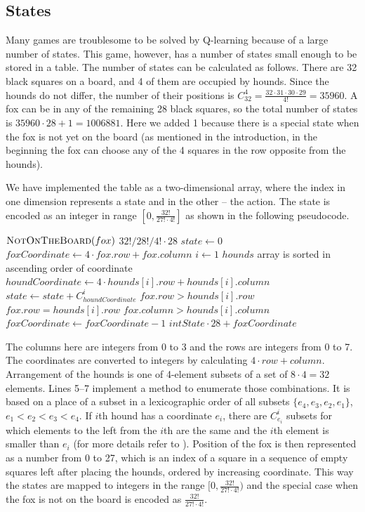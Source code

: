 \documentclass[a4paper]{article}
\begin{document}
\subsection{States} \label{states}
Many games are troublesome to be solved by Q-learning because of a large number
of states. This game, however, has a number of states small enough to be stored
in a table. The number of states can be calculated as follows. There are 32
black squares on a board, and 4 of them are occupied by hounds. Since the
hounds do not differ, the number of their positions is $C_{32}^4 = \frac{32
\cdot 31 \cdot 30 \cdot 29}{4!} = 35960$. A fox can be in any of the remaining
28 black squares, so the total number of states is $35960 \cdot 28 + 1 =
1006881$. Here we added 1 because there is a special state when the fox is not
yet on the board (as mentioned in the introduction, in the beginning the fox
can choose any of the 4 squares in the row opposite from the hounds).

We have implemented the table as a two-dimensional array, where the index in
one dimension represents a state and in the other -- the action. The state is
encoded as an integer in range $[0, \frac{32!}{27! \cdot 4!}]$ as shown in the
following pseudocode.

\begin{codebox}
    \li \If $\textnormal{\scshape NotOnTheBoard}(fox)$
    \li     \Then \Return $32! / 28! / 4! \cdot 28$
        \End
    \li $state \gets 0$
    \li $foxCoordinate \gets 4 \cdot fox.row + fox.column$
    \li \For $i \gets 1$  \>\>\>\>\> \Comment $hounds$ array is sorted in
                                                   ascending order of coordinate
    \li \Do $houndCoordinate \gets 4 \cdot hounds[i].row + hounds[i].column$
    \li     $state \gets state + C_{houndCoordinate}^i$
    \li     \If $fox.row > hounds[i].row$ 
    \li \>\> $fox.row = hounds[i].row$  $fox.column > hounds[i].column$
    \li         \Then $foxCoordinate \gets foxCoordinate - 1$
            \End
        \End
    \li \Return $intState \cdot 28 + foxCoordinate$
    \End
\end{codebox}

The columns here are integers from 0 to 3 and the rows are integers from 0 to 7.
The coordinates are converted to integers by calculating $4 \cdot row +
column$. Arrangement of the hounds is one of 4-element subsets of a set of $8
\cdot 4 = 32$ elements. Lines 5--7 implement a method to enumerate those
combinations. It is based on a place of a subset in a lexicographic order of all
subsets $\{e_4, e_3, e_2, e_1\}$, $e_1 < e_2 < e_3 < e_4$. If $i$th hound has
a coordinate $e_i$, there are $C_{e_i}^i$ subsets for which elements to the
left from the $i$th are the same and the $i$th element is smaller than $e_i$
(for more details refer to \cite{knuth02}). Position of the fox is then
represented as a number from 0 to 27, which is an index of a square in a
sequence of empty squares left after placing the hounds, ordered by increasing
coordinate. This way the states are mapped to integers in the range $[0,
\frac{32!}{27! \cdot 4!})$ and the special case when the fox is not on the
board is encoded as $\frac{32!}{27!  \cdot 4!}$.
\end{document}
